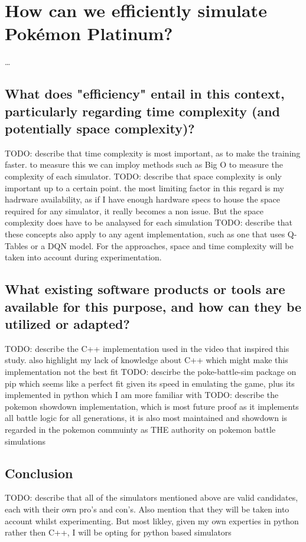 \section{How can we efficiently simulate Pokémon Platinum?}
\dots

\subsection{What does "efficiency" entail in this context, particularly regarding time complexity (and potentially space complexity)?}
TODO: describe that time complexity is most important, as to make the training faster. to measure this we can imploy methods such as Big O to measure the complexity of each simulator.
TODO: describe that space complexity is only important up to a certain point. the most limiting factor in this regard is my hadrware availability, as if I have enough hardware specs to house the space required for any simulator, it really becomes a non issue. But the space complexity does have to be analaysed for each simulation
TODO: describe that these concepts also apply to any agent implementation, such as one that uses Q-Tables or a DQN model. For the approaches, space and time complexity will be taken into account during experimentation. 

\subsection{What existing software products or tools are available for this purpose, and how can they be utilized or adapted?}

TODO: describe the C++ implementation used in the video that inspired this study. also highlight my lack of knowledge about C++ which might make this implementation not the best fit
TODO: descirbe the poke-battle-sim package on pip which seems like a perfect fit given its speed in emulating the game, plus its implemented in python which I am more familiar with 
TODO: describe the pokemon showdown implementation, which is most future proof as it implements all battle logic for all generations, it is also most maintained and showdown is regarded in the pokemon commuinty as THE authority on pokemon battle simulations

\subsection{Conclusion}

TODO: describe that all of the simulators mentioned above are valid candidates, each with their own pro's and con's. Also mention that they will be taken into account whilst experimenting. But most likley, given my own experties in python rather then C++, I will be opting for python based simulators